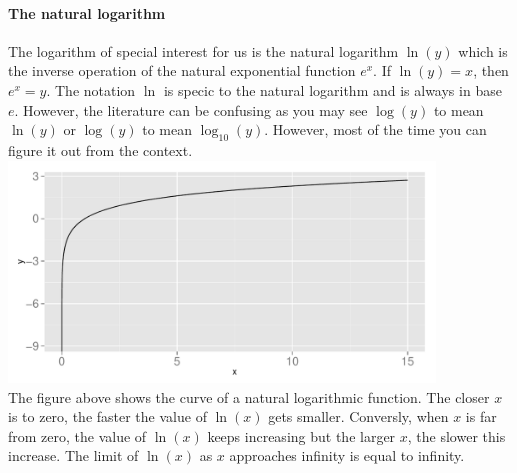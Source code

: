 \documentclass[a4paper]{report}
\begin{document}
\paragraph{The natural logarithm}
The logarithm of special interest for us is the natural logarithm $\ln(y)$ which is the inverse operation of the natural exponential function $e^x$. If $\ln(y) = x$, then $e^x = y$. The notation $\ln$ is specic to the natural logarithm and is always in base $e$. However, the literature can be confusing as you may see $\log(y)$ to mean $\ln(y)$ or $\log(y)$ to mean $\log_{10}(y)$. However, most of the time you can figure it out from the context.\\
\includegraphics[width=0.85\textwidth]{ln_plot.pdf}\\
The figure above shows the curve of a natural logarithmic function. The closer $x$ is to zero, the faster the value of $\ln(x)$ gets smaller. Conversly, when $x$ is far from zero, the value of $\ln(x)$ keeps increasing but the larger $x$, the slower this increase. The limit of $\ln(x)$ as $x$ approaches infinity is equal to infinity.\\
\end{document}
